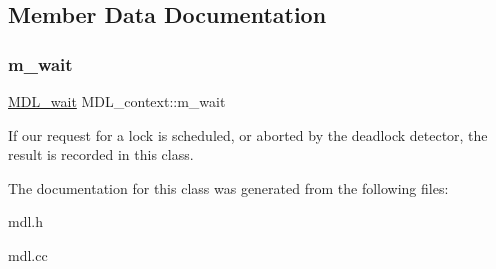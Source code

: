 \subsection{Member Data Documentation}
\mbox{\label{classMDL__context_aeaf51be6c5480bb1e718aea933f55d9d}} 
\subsubsection{\texorpdfstring{m\+\_\+wait}{m\_wait}}
{\footnotesize\ttfamily \mbox{\hyperlink{classMDL__wait}{M\+D\+L\+\_\+wait}} M\+D\+L\+\_\+context\+::m\+\_\+wait}

If our request for a lock is scheduled, or aborted by the deadlock detector, the result is recorded in this class. 

The documentation for this class was generated from the following files\+:\begin{DoxyCompactItemize}
\item 
mdl.\+h\item 
mdl.\+cc\end{DoxyCompactItemize}
